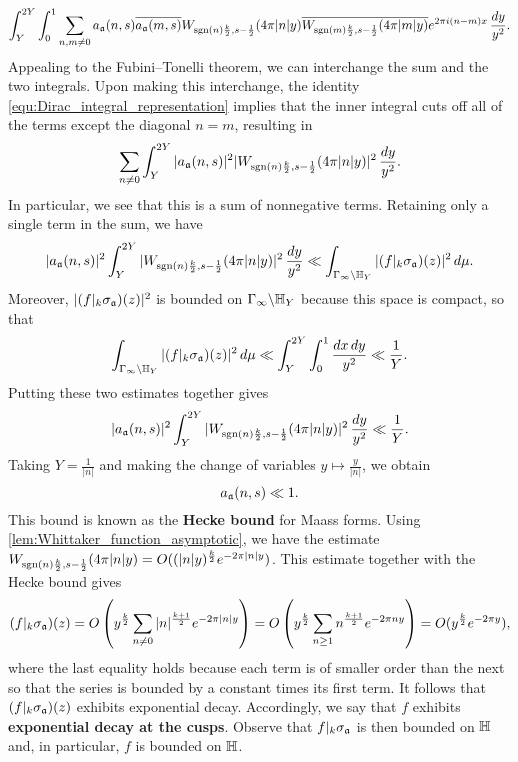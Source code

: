     \[
      \int_{Y}^{2Y}\int_{0}^{1}\sum_{n,m \neq 0}a_{\mathfrak{a}}(n,s)\overline{a_{\mathfrak{a}}(m,s)}W_{\operatorname{\mathrm{sgn}}(n)\frac{k}{2},s-\frac{1}{2}}(4\pi|n|y)\overline{W_{\operatorname{\mathrm{sgn}}(m)\frac{k}{2},s-\frac{1}{2}}(4\pi|m|y)}e^{2\pi i(n-m)x}\,\frac{dy}{y^{2}}.
    \]
    Appealing to the Fubini–Tonelli theorem, we can interchange the sum and the two integrals. Upon making this interchange, the identity \cref{equ:Dirac_integral_representation} implies that the inner integral cuts off all of the terms except the diagonal $n = m$, resulting in
    \[
      \sum_{n \neq 0}\int_{Y}^{2Y}|a_{\mathfrak{a}}(n,s)|^{2}|W_{\operatorname{\mathrm{sgn}}(n)\frac{k}{2},s-\frac{1}{2}}(4\pi|n|y)|^{2}\,\frac{dy}{y^{2}}.
    \]
    In particular, we see that this is a sum of nonnegative terms. Retaining only a single term in the sum, we have
    \[
      |a_{\mathfrak{a}}(n,s)|^{2}\int_{Y}^{2Y}|W_{\operatorname{\mathrm{sgn}}(n)\frac{k}{2},s-\frac{1}{2}}(4\pi|n|y)|^{2}\,\frac{dy}{y^{2}} \ll \int_{\Gamma_{\infty}\backslash\mathbb{H}_{Y}}|(f|_{k}\sigma_{\mathfrak{a}})(z)|^{2}\,d\mu.
    \]
    Moreover, $|(f|_{k}\sigma_{\mathfrak{a}})(z)|^{2}$ is bounded on $\Gamma_{\infty}\backslash\mathbb{H}_{Y}$ because this space is compact, so that
    \[
      \int_{\Gamma_{\infty}\backslash\mathbb{H}_{Y}}|(f|_{k}\sigma_{\mathfrak{a}})(z)|^{2}\,d\mu \ll \int_{Y}^{2Y}\int_{0}^{1}\frac{dx\,dy}{y^{2}} \ll \frac{1}{Y}.
    \]
    Putting these two estimates together gives
    \[
      |a_{\mathfrak{a}}(n,s)|^{2}\int_{Y}^{2Y}|W_{\operatorname{\mathrm{sgn}}(n)\frac{k}{2},s-\frac{1}{2}}(4\pi|n|y)|^{2}\,\frac{dy}{y^{2}} \ll \frac{1}{Y}.
    \]
    Taking $Y = \frac{1}{|n|}$ and making the change of variables $y \mapsto \frac{y}{|n|}$, we obtain
    \[
      a_{\mathfrak{a}}(n,s) \ll 1.
    \]
    This bound is known as the \textbf{Hecke bound} for Maass forms. Using \cref{lem:Whittaker_function_asymptotic}, we have the estimate $W_{\operatorname{\mathrm{sgn}}(n)\frac{k}{2},s-\frac{1}{2}}(4\pi|n|y) = O((|n|y)^{\frac{k}{2}}e^{-2\pi|n|y})$. This estimate together with the Hecke bound gives
    \[
      (f|_{k}\sigma_{\mathfrak{a}})(z) = O\left(y^{\frac{k}{2}}\sum_{n \neq 0}|n|^{\frac{k+1}{2}}e^{-2\pi|n|y}\right) = O\left(y^{\frac{k}{2}}\sum_{n \ge 1}n^{\frac{k+1}{2}}e^{-2\pi ny}\right) = O(y^{\frac{k}{2}}e^{-2\pi y}),
    \]
    where the last equality holds because each term is of smaller order than the next so that the series is bounded by a constant times its first term. It follows that $(f|_{k}\sigma_{\mathfrak{a}})(z)$ exhibits exponential decay. Accordingly, we say that $f$ exhibits \textbf{exponential decay at the cusps}. Observe that $f|_{k}\sigma_{\mathfrak{a}}$ is then bounded on $\mathbb{H}$ and, in particular, $f$ is bounded on $\mathbb{H}$.
